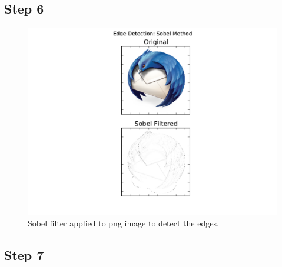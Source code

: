 \documentclass[a4paper]{article}
\begin{document}
\newpage
\subsection*{Step 6}


\begin{figure}[h!] 
\begin{center} 
\includegraphics[scale=0.5]{../Week4/BLAC_hw6_TLRH_6126561_edges.pdf} 
\caption{Sobel filter applied to png image to detect the edges.}
\end{center} 
\end{figure} 

\newpage
\subsection*{Step 7}

\end{document}
